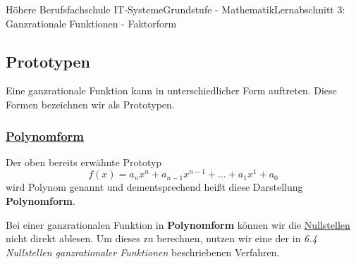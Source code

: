 \documentclass[11pt,twocolumn,oneside,openany,headings=optiontotoc,11pt,numbers=noenddot]{article}
\begin{document}
	\begin{worksheet}{Höhere Berufsfachschule IT-Systeme}{Grundstufe - Mathematik}{Lernabschnitt 3: Ganzrationale Funktionen - Faktorform}
		\setcounter{section}{6}
		\setcounter{subsection}{1}
		\noindent
		\subsection{Prototypen}
		Eine ganzrationale Funktion kann in unterschiedlicher Form auftreten. Diese Formen bezeichnen wir als Prototypen.
		\subsubsection{\underline{Polynomform}}
		Der oben bereits erwähnte Prototyp \[f(x) = a_nx^n + a_{n-1}x^{n-1} + \ldots + a_1x^1 + a_0\] wird Polynom genannt und dementsprechend heißt diese Darstellung \textbf{Polynomform}.
		\begin{framed}
			\noindent
			Bei einer ganzrationalen Funktion in \textbf{Polynomform} können wir die \underline{Nullstellen} nicht direkt ablesen. Um dieses zu berechnen, nutzen wir eine der in \textit{6.4 Nullstellen ganzrationaler Funktionen} beschriebenen Verfahren.
		\end{framed}

\end{worksheet}
\end{document}
